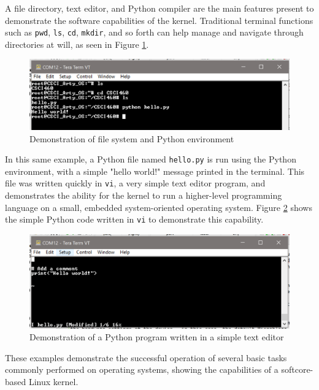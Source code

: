 \documentclass{article}
\begin{document}
A file directory, text editor, and Python compiler are the main features present to demonstrate the software capabilities of the kernel. Traditional terminal functions such as \texttt{pwd}, \texttt{ls}, \texttt{cd}, \texttt{mkdir}, and so forth can help manage and navigate through directories at will, as seen in Figure \ref{fig:python_1}.\par

\begin{figure}[!htb]
	\centering
	\includegraphics [width=\textwidth] {python_example_1.png}
	\caption{Demonstration of file system and Python environment}
	\label{fig:python_1}
\end{figure} 

In this same example, a Python file named \texttt{hello.py} is run using the Python environment, with a simple "hello world!" message printed in the terminal. This file was written quickly in \texttt{vi}, a very simple text editor program, and demonstrates the ability for the kernel to run a higher-level programming language on a small, embedded system-oriented operating system. Figure \ref{fig:vi} shows the simple Python code written in \texttt{vi} to demonstrate this capability.\par

\begin{figure}[!htb]
	\centering
	\includegraphics [width=\textwidth] {python_example_2.png}
	\caption{Demonstration of a Python program written in a simple text editor}
	\label{fig:vi}
\end{figure} 

These examples demonstrate the successful operation of several basic tasks commonly performed on operating systems, showing the capabilities of a softcore-based Linux kernel.\par
\end{document}

